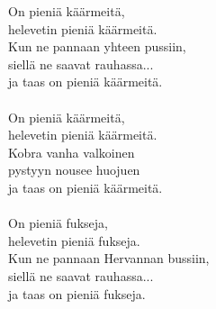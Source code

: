 
            On pieniä käärmeitä, \\
            helevetin pieniä käärmeitä. \\
            Kun ne pannaan yhteen pussiin, \\
            siellä ne saavat rauhassa... \\
            ja taas on pieniä käärmeitä. \\
\hspace{10mm} \\
            On pieniä käärmeitä, \\
            helevetin pieniä käärmeitä. \\
            Kobra vanha valkoinen \\
            pystyyn nousee huojuen \\
            ja taas on pieniä käärmeitä. \\
\hspace{10mm} \\
            On pieniä fukseja, \\
            helevetin pieniä fukseja. \\
            Kun ne pannaan Hervannan bussiin, \\
            siellä ne saavat rauhassa... \\
            ja taas on pieniä fukseja. \\
